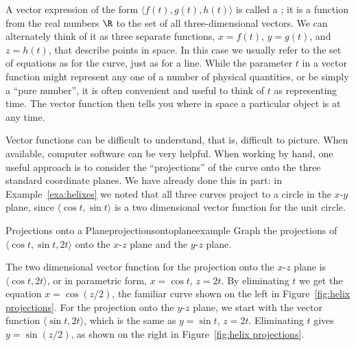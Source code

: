 A vector expression of the form $\langle f(t),g(t),h(t)\rangle$ is called
a ; it is a function from
the real numbers $\R$ to the set of all three-dimensional vectors.
We can alternately think of it as three separate functions, 
$x=f(t)$, $y=g(t)$, and $z=h(t)$, that describe points in space. In
this case we usually refer to the set of equations as
 for the curve, just
as for a line. While the parameter $t$ in a vector function might
represent any one of a number of physical quantities, or be simply a
``pure number'', it is often convenient and useful to think of $t$ as
representing time. The vector function then tells you where in space
a particular object is at any time.

Vector functions can be difficult to understand, that is, difficult to
picture. When available, computer software can be very helpful. When
working by hand, one useful approach is to consider the
``projections'' of the curve onto the three standard coordinate
planes. We have already done this in part: in
Example~\ref{exa:helixes} we noted that all three curves project to
a circle in the $x$-$y$ plane, since $\langle \cos t,\sin t\rangle$ is
a two dimensional vector function for the unit circle.

\begin{example}{Projections onto a Plane}{projectionsontoplaneexample}
Graph the projections of $\langle \cos t,\sin
t,2t\rangle$ onto the $x$-$z$ plane and the $y$-$z$ plane.
\end{example}
\begin{solution}
The two dimensional vector function for the
projection onto the $x$-$z$ plane is $\langle \cos t, 2t\rangle$, or in
parametric form, $x=\cos t$, $z=2t$. By eliminating $t$ we get the
equation $x=\cos(z/2)$, the familiar curve shown on the left in
Figure~\ref{fig:helix projections}. For the projection onto the $y$-$z$ plane, we start
with the vector function $\langle \sin t, 2t\rangle$, which is the
same as $y=\sin t$, $z=2t$. Eliminating $t$ gives $y=\sin(z/2)$, as
shown on the right in Figure~\ref{fig:helix projections}.
\end{solution}


